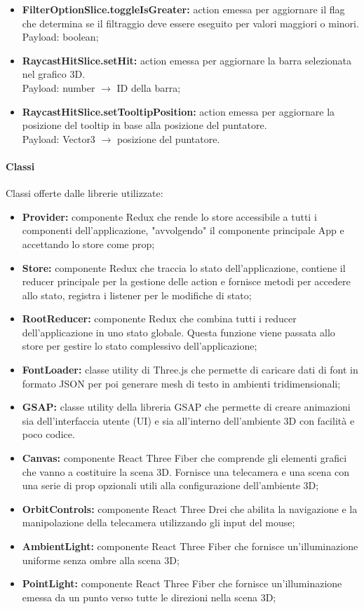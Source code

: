 \begin{itemize}
      \item \textbf{FilterOptionSlice.toggleIsGreater:} action emessa per aggiornare il flag che determina se il filtraggio deve essere eseguito per valori maggiori o minori. \\ Payload: boolean;
      \item \textbf{RaycastHitSlice.setHit:} action emessa per aggiornare la barra selezionata nel grafico 3D. \\ Payload: number $\rightarrow$ ID della barra;
      \item \textbf{RaycastHitSlice.setTooltipPosition:} action emessa per aggiornare la posizione del tooltip in base alla posizione del puntatore.\\ Payload: Vector3 $\rightarrow$ posizione del puntatore.
\end{itemize}
\paragraph{Classi}
Classi offerte dalle librerie utilizzate:
\begin{itemize}
      \item \textbf{Provider:} componente Redux che rende lo store accessibile a tutti i componenti dell'applicazione, "avvolgendo" il componente principale App e accettando lo store come prop;
      \item \textbf{Store:} componente Redux che traccia lo stato dell'applicazione, contiene il reducer principale per la gestione delle action e fornisce metodi per accedere allo stato,
            registra i listener per le modifiche di stato;
      \item \textbf{RootReducer:} componente Redux che combina tutti i reducer dell'applicazione in uno stato
            globale. Questa funzione viene passata allo store per gestire lo stato complessivo dell'applicazione;
      \item \textbf{FontLoader:} classe utility di Three.js che permette di caricare dati di font in formato JSON per poi generare mesh di testo in ambienti tridimensionali;
      \item \textbf{GSAP:} classe utility della libreria GSAP che permette di creare animazioni sia dell'interfaccia utente (UI) e sia all'interno dell'ambiente 3D con facilità e poco codice.
      \item \textbf{Canvas:} componente React Three Fiber che comprende gli elementi grafici che vanno a costituire la scena 3D.
            Fornisce una telecamera e una scena con una serie di prop opzionali utili alla configurazione dell'ambiente 3D;
      \item \textbf{OrbitControls:} componente React Three Drei che abilita la navigazione e la manipolazione della telecamera utilizzando gli input del mouse;
      \item \textbf{AmbientLight:} componente React Three Fiber che fornisce un'illuminazione uniforme senza ombre alla scena 3D;
      \item \textbf{PointLight:} componente React Three Fiber che fornisce un'illuminazione emessa da un punto verso tutte le direzioni nella scena 3D;
\end{itemize}
